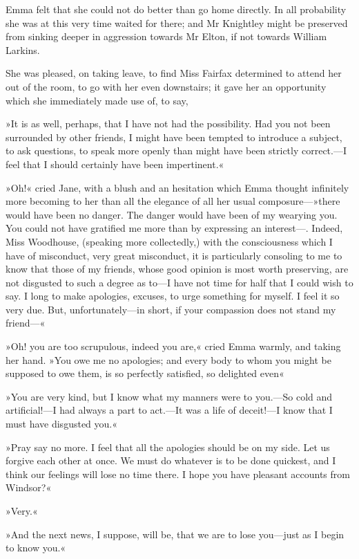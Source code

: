 Emma felt that she could not do better than go home directly. In all probability she was at this very time waited for there; and Mr Knightley might be preserved from sinking deeper in aggression towards Mr Elton, if not towards William Larkins.

She was pleased, on taking leave, to find Miss Fairfax determined to attend her out of the room, to go with her even downstairs; it gave her an opportunity which she immediately made use of, to say,

»It is as well, perhaps, that I have not had the possibility. Had you not been surrounded by other friends, I might have been tempted to introduce a subject, to ask questions, to speak more openly than might have been strictly correct.—I feel that I should certainly have been impertinent.«

»Oh!« cried Jane, with a blush and an hesitation which Emma thought infinitely more becoming to her than all the elegance of all her usual composure—»there would have been no danger. The danger would have been of my wearying you. You could not have gratified me more than by expressing an interest—. Indeed, Miss Woodhouse, (speaking more collectedly,) with the consciousness which I have of misconduct, very great misconduct, it is particularly consoling to me to know that those of my friends, whose good opinion is most worth preserving, are not disgusted to such a degree as to—I have not time for half that I could wish to say. I long to make apologies, excuses, to urge something for myself. I feel it so very due. But, unfortunately—in short, if your compassion does not stand my friend—«

»Oh! you are too scrupulous, indeed you are,« cried Emma warmly, and taking her hand. »You owe me no apologies; and every body to whom you might be supposed to owe them, is so perfectly satisfied, so delighted even\longdash«

»You are very kind, but I know what my manners were to you.—So cold and artificial!—I had always a part to act.—It was a life of deceit!—I know that I must have disgusted you.«

»Pray say no more. I feel that all the apologies should be on my side. Let us forgive each other at once. We must do whatever is to be done quickest, and I think our feelings will lose no time there. I hope you have pleasant accounts from Windsor?«

»Very.«

»And the next news, I suppose, will be, that we are to lose you—just as I begin to know you.«


